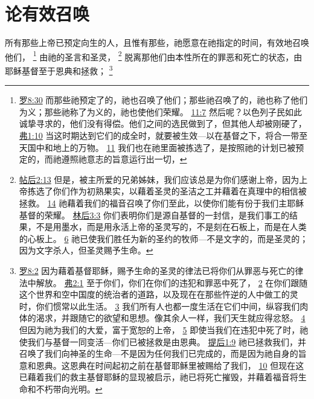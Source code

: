 \documentclass[12pt, a4paper, oneside]{ctexart}
\newcounter{parnum}[section]
\newcommand{\N}{%
   \noindent\refstepcounter{parnum}%
    \makebox[\parindent][l]{\textbf{\arabic{parnum}.}}}
\begin{document}
\section{论有效召唤}

\N 所有那些上帝已预定向生的人，且惟有那些，祂愿意在祂指定的时间，有效地召唤他们，
	\footnote {
		\href{https://biblehub.com/romans/8-30.htm}{罗8:30} 而那些祂预定了的，祂也召唤了他们；那些祂召唤了的，祂也称了他们为义；那些祂称了为义的，祂也使他们荣耀。
		\href{https://biblehub.com/romans/11-7.htm}{11:7} 然后呢？以色列子民如此诚挚寻求的，他们没有得偿。他们之间的选民做到了，但其他人却被刚硬了，
		\href{https://biblehub.com/ephesians/1-10.htm}{弗1:10} 当这时期达到它们的成全时，就要被生效---以在基督之下，将合一带至天国中和地上的万物。
		\href{https://biblehub.com/ephesians/1-11.htm}{11} 我们也在祂里面被拣选了，是按照祂的计划已被预定的，而祂遵照祂意志的旨意运行出一切，
	}
	由祂的圣言和圣灵，
	\footnote {
		\href{https://biblehub.com/2_thessalonians/2-13.htm}{帖后2:13} 但是，被主所爱的兄弟姊妹，我们应该总是为你们感谢上帝，因为上帝拣选了你们作为初熟果实，以藉着圣灵的圣洁之工并藉着在真理中的相信被拯救。
		\href{https://biblehub.com/2_thessalonians/2-14.htm}{14} 祂藉着我们的福音召唤了你们至此，以使你们能有份于我们主耶稣基督的荣耀。
		\href{https://biblehub.com/2_corinthians/3-3.htm}{林后3:3} 你们表明你们是源自基督的一封信，是我们事工的结果，不是用墨水，而是用永活上帝的圣灵写的，不是刻在石板上，而是在人类的心板上。
		\href{https://biblehub.com/2_corinthians/3-6.htm}{6} 祂已使我们胜任为新的圣约的牧师---不是文字的，而是圣灵的；因为文字杀人，但圣灵赐予生命。
	}
	脱离那他们由本性所在的罪恶和死亡的状态，由耶稣基督至于恩典和拯救；
	\footnote {
		\href{https://biblehub.com/romans/8-2.htm}{罗8:2} 因为藉着基督耶稣，赐予生命的圣灵的律法已将你们从罪恶与死亡的律法中解放。
		\href{https://biblehub.com/ephesians/2-1.htm}{弗2:1} 至于你们，你们在你们的违犯和罪恶中死了，
		\href{https://biblehub.com/ephesians/2-2.htm}{2} 在你们跟随这个世界和空中国度的统治者的道路，以及现在在那些忤逆的人中做工的灵时，你们惯常以此生活。
		\href{https://biblehub.com/ephesians/2-3.htm}{3} 我们所有人也都一度生活在它们中间，纵容我们肉体的渴求，并跟随它的欲望和思想。像其余人一样，我们天生就应得忿怒。
		\href{https://biblehub.com/ephesians/2-4.htm}{4} 但因为祂为我们的大爱，富于宽恕的上帝，
		\href{https://biblehub.com/ephesians/2-5.htm}{5} 即使当我们在违犯中死了时，祂使我们与基督一同变活---你们已被拯救是由恩典。
		\href{https://biblehub.com/2_timothy/1-9.htm}{提后1:9} 祂已拯救我们，并召唤了我们向神圣的生命---不是因为任何我们已完成的，而是因为祂自身的旨意和恩典。这恩典在时间起初之前在基督耶稣里被赐给了我们，
		\href{https://biblehub.com/2_timothy/1-10.htm}{10} 但现在这已藉着我们的救主基督耶稣的显现被启示，祂已将死亡摧毁，并藉着福音将生命和不朽带向光明。
	}
\end{document}
